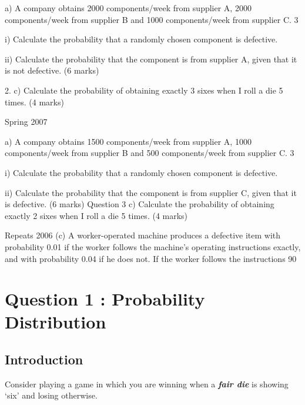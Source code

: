 \documentclass[12pt]{report}
\begin{document}
 a) A company obtains 2000 components/week from supplier A, 2000 components/week from supplier B and 1000 components/week from supplier C. 3%
 
 i) Calculate the probability that a randomly chosen component is defective.
 
 ii) Calculate the probability that the component is from supplier A, given that it is not defective.
 (6 marks)
 
 2.              c) Calculate the probability of obtaining exactly 3 sixes when I roll a die
 5 times.
 (4 marks)
 
 
 
 
 
 Spring 2007
 
 a) A company obtains 1500 components/week from supplier A, 1000 components/week from supplier B and 500 components/week from supplier C. 3%
 
 i) Calculate the probability that a randomly chosen component is defective.
 
 ii) Calculate the probability that the component is from supplier C, given that it is defective.
 (6 marks)
 Question 3
 c) Calculate the probability of obtaining exactly 2 sixes when I roll a die 5 times.
 (4 marks)
 
 Repeats 2006
 (c)              A worker-operated machine produces a defective item with probability 0.01 if the worker follows the machine’s operating instructions exactly, and with probability 0.04 if he does not. If the worker follows the instructions 90%
 
 
 
\section*{Question 1 : Probability Distribution}

\subsection*{Introduction}{\LARGE Consider playing a game in which you are winning when a \textbf{\emph{fair die}} is showing `six'
	and losing otherwise.}
\end{document}
